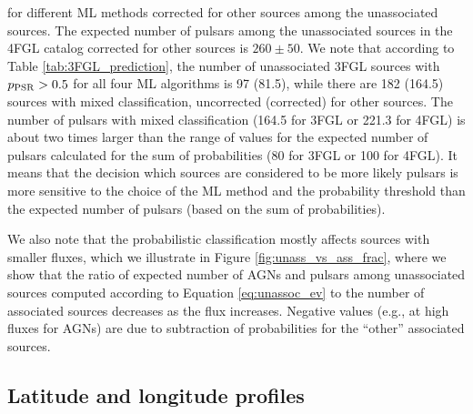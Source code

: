 for different ML methods corrected for other sources among the unassociated sources.
The expected number of pulsars among the unassociated sources in the 4FGL catalog corrected for other sources is $260 \pm 50$.
We note that according to Table \ref{tab:3FGL_prediction}, the number of unassociated 3FGL sources 
with $p_{\rm PSR} > 0.5$ for all four ML algorithms is 97 (81.5), while there are 182 (164.5) sources with mixed classification,
uncorrected (corrected) for other sources.
The number of pulsars with mixed classification (164.5 for 3FGL or 221.3 for 4FGL)
is about two times larger than the range of values for the expected number of pulsars calculated for the sum of probabilities 
(80 for 3FGL or 100 for 4FGL).
It means that the decision which sources are considered to be more likely pulsars is more sensitive to the choice of the ML method
and the probability threshold than the expected number of pulsars (based on the sum of probabilities).

We also note that the probabilistic classification mostly affects sources with smaller fluxes,
which we illustrate in Figure \ref{fig:unass_vs_ass_frac}, where we show that the ratio of expected number of AGNs and pulsars among unassociated sources computed according to Equation \ref{eq:unassoc_ev} to the number of associated sources decreases as the flux increases.
Negative values (e.g., at high fluxes for AGNs) are due to subtraction of probabilities for the ``other'' associated sources.

\subsection{Latitude and longitude profiles}

